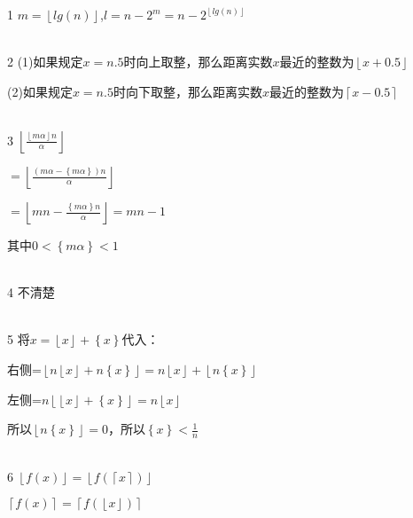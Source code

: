 \documentclass[onecolumn]{article}
\begin{document}
1 $m=\left \lfloor lg(n) \right \rfloor$,$l=n-2^{m}=n-2^{\left \lfloor lg(n) \right \rfloor}$ \par
~\\
2 (1)如果规定$x=n.5$时向上取整，那么距离实数$x$最近的整数为$\left \lfloor x+0.5 \right \rfloor$ \par
(2)如果规定$x=n.5$时向下取整，那么距离实数$x$最近的整数为$\left \lceil x-0.5 \right \rceil$ \par
~\\
3 $\left \lfloor \frac{\left \lfloor m\alpha \right \rfloor n}{\alpha} \right \rfloor$ \par
$=\left \lfloor \frac{(m\alpha - \left \{ m\alpha \right \})n}{\alpha} \right \rfloor$\par
$=\left \lfloor mn-\frac{\left \{ m\alpha \right \}n}{\alpha} \right \rfloor=mn-1$\par
其中$0<\left \{ m\alpha \right \}<1$\par
~\\
4 不清楚 \par
~\\
5 将$x=\left \lfloor x \right \rfloor+\left \{ x \right \}$代入：\par
右侧=$\left \lfloor n\left \lfloor x \right \rfloor+n\left \{ x \right \} \right \rfloor=n\left \lfloor x \right \rfloor+\left \lfloor n\left \{ x \right \} \right \rfloor$ \par
左侧=$n\left \lfloor \left \lfloor x \right \rfloor +\left \{ x \right \}\right \rfloor=n\left \lfloor x \right \rfloor$ \par
所以$\left \lfloor n\left \{ x \right \} \right \rfloor=0$，所以$\left \{ x \right \}<\frac{1}{n}$ \par
~\\
6 $\left \lfloor f(x) \right \rfloor=\left \lfloor f(\left \lceil x \right \rceil) \right \rfloor$ \par
$\left \lceil f(x) \right \rceil=\left \lceil f(\left \lfloor x \right \rfloor) \right \rceil$ \par
~\\
\end{document}

